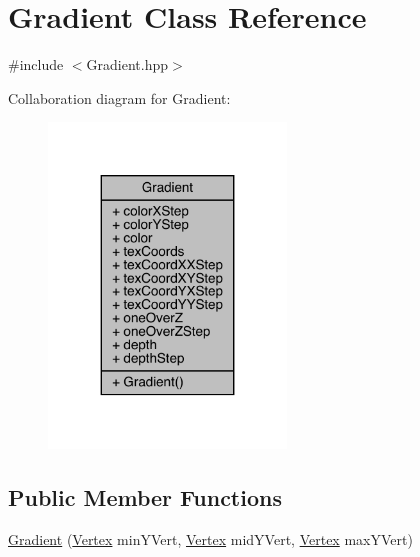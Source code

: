 \hypertarget{class_gradient}{}\section{Gradient Class Reference}
\label{class_gradient}


{\ttfamily \#include $<$Gradient.\+hpp$>$}



Collaboration diagram for Gradient\+:\nopagebreak
\begin{figure}[H]
\begin{center}
\leavevmode
\includegraphics[width=179pt]{class_gradient__coll__graph}
\end{center}
\end{figure}
\subsection*{Public Member Functions}
\begin{DoxyCompactItemize}
\item 
\hyperlink{class_gradient_a4fd340dfd44bc432746d239cb809a0ee}{Gradient} (\hyperlink{struct_vertex}{Vertex} min\+Y\+Vert, \hyperlink{struct_vertex}{Vertex} mid\+Y\+Vert, \hyperlink{struct_vertex}{Vertex} max\+Y\+Vert)
\end{DoxyCompactItemize}
